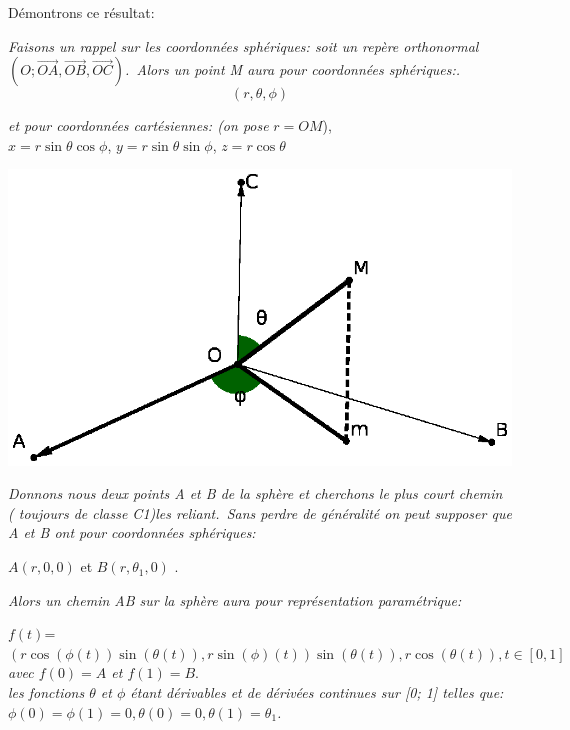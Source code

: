 \documentclass[a4paper, 12pt, twoside]{book}
\begin{document}
     Démontrons ce résultat:\
     
     \textit{  Faisons un rappel sur les coordonnées sphériques: soit un repère orthonormal $(O; \vec{OA},\vec{OB},\vec{OC})$.\
  Alors un point M aura pour coordonnées sphériques:.} \
  $$(r,\theta,\phi)$$
  
  \textit{et pour coordonnées cartésiennes: (on pose }$r=OM$),\\
 
  $x=r\sin \theta\cos \phi$,
  $y=r\sin \theta\sin \phi$,
  $z=r\cos \theta$ 
  
 \includegraphics[scale=0.8]{figures/coordonneespheriques.eps} 
  
    \textit{Donnons nous deux points A et B de la sphère et cherchons le plus court chemin ( toujours de classe C1)les reliant.\
    Sans perdre de généralité on peut supposer que A et B ont pour coordonnées sphériques:}\
    
    $A(r,0,0)$ et $B(r,\theta_{1},0)$ .\
    
   \textit{ Alors un chemin AB sur la sphère aura pour représentation paramétrique:}\
    
    $f(t)$=$(r\cos(\phi(t))\sin (\theta(t)),r\sin(\phi)(t))\sin (\theta(t)),r\cos(\theta(t)), t\in[0,1]
$\\
\textit{avec $f(0)=A$ et $f(1)=B$}. \\

\textit{les fonctions $\theta$ et $\phi$ étant dérivables et de dérivées continues sur [0; 1] telles que:$\phi(0)=\phi(1)=0,\theta(0)=0,\theta(1)=\theta_{1}$.}\\
\end{document}
